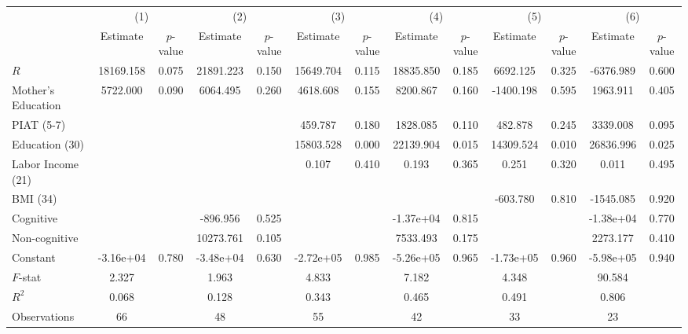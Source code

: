 \begin{table}[htbp]
\begin{tabular}{lcccccccccccc} \toprule
 & \multicolumn{2}{c}{(1)}  &  \multicolumn{2}{c}{(2)}  &  \multicolumn{2}{c}{(3)}  &  \multicolumn{2}{c}{(4)}  & \multicolumn{2}{c}{(5)} & \multicolumn{2}{c}{(6)} \\  
 & Estimate & $p$-value & Estimate & $p$-value & Estimate & $p$-value & Estimate & $p$-value & Estimate & $p$-value & Estimate & $p$-value \\ \midrule
$R$ & 18169.158 &     0.075 & 21891.223 &     0.150 & 15649.704 &     0.115 & 18835.850 &     0.185 &  6692.125 &     0.325 & -6376.989 &     0.600 \\  
Mother's Education &  5722.000 &     0.090 &  6064.495 &     0.260 &  4618.608 &     0.155 &  8200.867 &     0.160 & -1400.198 &     0.595 &  1963.911 &     0.405 \\  
PIAT (5-7) &         &         &         &         &   459.787 &     0.180 &  1828.085 &     0.110 &   482.878 &     0.245 &  3339.008 &     0.095 \\  
Education (30) &         &         &         &         & 15803.528 &     0.000 & 22139.904 &     0.015 & 14309.524 &     0.010 & 26836.996 &     0.025 \\  
Labor Income (21) &         &         &         &         &     0.107 &     0.410 &     0.193 &     0.365 &     0.251 &     0.320 &     0.011 &     0.495 \\  
BMI (34) &         &         &         &         &         &         &         &         &  -603.780 &     0.810 & -1545.085 &     0.920 \\  
Cognitive &         &         &  -896.956 &     0.525 &         &         & -1.37e+04 &     0.815 &         &         & -1.38e+04 &     0.770 \\  
Non-cognitive &         &         & 10273.761 &     0.105 &         &         &  7533.493 &     0.175 &         &         &  2273.177 &     0.410 \\  
Constant & -3.16e+04 &     0.780 & -3.48e+04 &     0.630 & -2.72e+05 &     0.985 & -5.26e+05 &     0.965 & -1.73e+05 &     0.960 & -5.98e+05 &     0.940 \\  \midrule
$F$-stat &     2.327 &         &     1.963 &         &     4.833 &         &     7.182 &         &     4.348 &         &    90.584 &         \\  
$R^2$ &     0.068 &         &     0.128 &         &     0.343 &         &     0.465 &         &     0.491 &         &     0.806 &         \\  
Observations &    66 &         &    48 &         &    55 &         &    42 &         &    33 &         &    23 &         \\  
\bottomrule \end{tabular}
\end{table}
